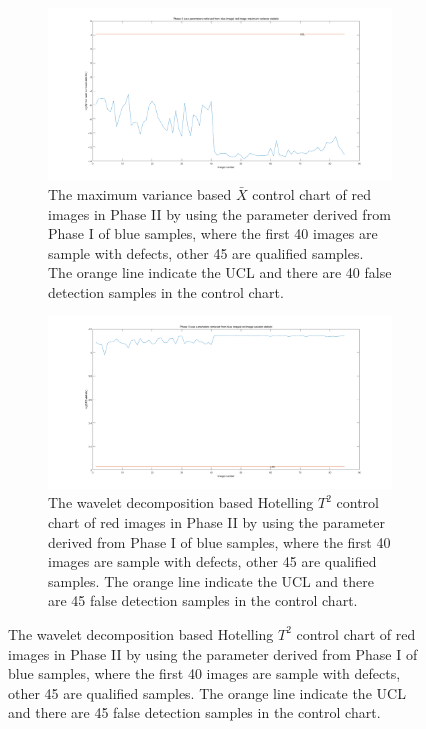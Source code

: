 \begin{figure}
    \centering
    \begin{subfigure}{\textwidth}
         \centering
         \includegraphics[width=\textwidth]{images/phase_II_max_use_blue_sample.png}
         \caption{The maximum variance based $\bar{X}$ control chart of red images in Phase II by using the parameter derived from Phase I of blue samples, where the first 40 images are sample with defects, other 45 are qualified samples. The orange line indicate the UCL and there are 40 false detection samples in the control chart.}
        \label{fig:phase_II_max_use_blue_sample}
    \end{subfigure}
     
    \begin{subfigure}{\textwidth}
         \centering
         \includegraphics[width=\textwidth]{images/phase_II_t2_use_blue_sample.png}
         \caption{The wavelet decomposition based Hotelling $T^{2}$ control chart of red images in Phase II by using the parameter derived from Phase I of blue samples, where the first 40 images are sample with defects, other 45 are qualified samples. The orange line indicate the UCL and there are 45 false detection samples in the control chart.}
        \label{fig:phase_II_t2_use_blue_sample}
    \end{subfigure}
\end{figure}



